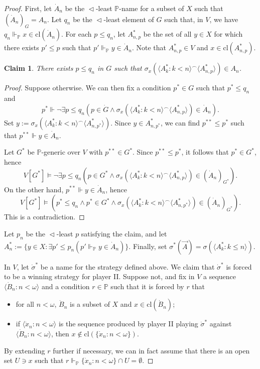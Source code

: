 \documentclass[10pt,a4paper]{amsart}
\newtheorem{claim}{Claim}
\renewcommand{\P}{\bb{P}}
\newcommand{\bb}{\mathbb}
\begin{document}
\begin{proof}
  First, let $\dot{A}_n$ be the $\vartriangleleft$-least $\P$-name for a subset of $X$ such that 
  $(\dot{A}_n)_G = A_n$. Let $q_n$ be the $\vartriangleleft$-least element of $G$ such that, in 
  $V$, we have $q_n \Vdash_{\P} x \in \mathrm{cl}(\dot{A}_n)$. For each $p \leq q_n$, 
  let $A^*_{n,p}$ be the set of all $y \in X$ for which there exists $p' \leq p$ such 
  that $p' \Vdash_{\P} y \in \dot{A}_n$. Note that $A^*_{n,p} \in V$ and 
  $x \in \mathrm{cl}(A^*_{n,p})$.
  
\begin{claim}\label{4.2}
There exists $p \leq q_n$ in $G$ such that 
  $\sigma_x(\langle A^*_k :k < n \rangle ^\frown \langle A^*_{n,p}\rangle) \in A_n$.
\end{claim} 

\begin{proof}
Suppose otherwise. We can then fix a condition $p^*\in G$ such that $p^*\le q_n$ and
\[
p^*\Vdash \neg\exists p\le q_n \left(p\in\dot G\wedge \sigma_x(\langle A^*_k :k < n \rangle ^\frown \langle A^*_{n,p}\rangle) \in \dot{A}_n\right).
\]
Set $y:=\sigma_x(\langle A^*_k :k < n \rangle ^\frown \langle A^*_{n,p^*}\rangle)$. Since $y\in A^*_{n,p^*}$, we can find $p^{**}\le p^*$ such that $p^{**}\Vdash y\in\dot A_n$.

Let $G^*$ be $\P$-generic over $V$ with $p^{**}\in G^*$. Since $p^{**}\le p^*$, it follows that $p^*\in G^*$, hence
\[
V[G^*]\models \neg\exists p\le q_n \left(p\in G^*\wedge \sigma_x(\langle A_k^*:k<n\rangle^\frown \langle A_{n,p}^*\rangle)\in (\dot{A}_n)_{G^*}\right).
\]
On the other hand, $p^{**}\Vdash y\in \dot A_n$, hence
\[
V[G^*]\models \left(p^*\le q_n \wedge p^*\in G^*\wedge \sigma_x(\langle A_k^*:k<n\rangle^\frown \langle A_{n,p^*}^*\rangle)\in (\dot{A}_n)_{G^*}\right).
\]
This is a contradiction.
\end{proof}

Let $p_n$ be the $\vartriangleleft$-least $p$ satisfying the claim, and let 
  $A^*_n := \{y \in X :\exists p' \leq p_n  (p' \Vdash_{\P} y \in \dot{A}_n)\}$. 
  Finally, set $\sigma^*(\vec{A}) = \sigma(\langle A^*_k :k \leq n \rangle)$.
  
  In $V$, let $\dot{\sigma}^*$ be a name for the strategy defined above. 
  We claim that $\dot{\sigma}^*$ is forced to be a winning strategy for player II. 
  Suppose not, and fix in $V$ a sequence $\langle \dot{B}_n :n < \omega \rangle$ 
  and a condition $r \in \P$ such that it is forced by $r$ that
  \begin{itemize}
    \item for all $n < \omega$, $\dot{B}_n$ is a subset of $X$ and $x \in 
    \mathrm{cl}(\dot{B}_n)$;
    \item if $\langle \dot{x}_n :n < \omega \rangle$ is the sequence produced by player II 
    playing $\dot{\sigma}^*$ against $\langle \dot{B}_n :n < \omega \rangle$, 
    then $x \notin \mathrm{cl}(\{\dot{x}_n :n < \omega\})$.
  \end{itemize}
  By extending $r$ further if necessary, we can in fact assume that there is an open set 
  $U \ni x$ such that $r \Vdash_{\P} \{\dot{x}_n :n < \omega\} \cap U = \emptyset$.
  

\end{proof}
\end{document}
